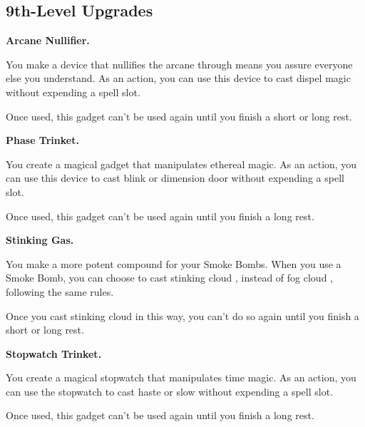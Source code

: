 \documentclass[11pt,twoside,openany]{book}  %
\begin{document}
\subsection{9th-Level Upgrades}
\begin{fiveitemize}

	\item \textbf{Arcane Nullifier.}
	
	You make a device that nullifies the arcane through means you assure everyone else you understand. As an action, you can use this device to cast dispel magic without expending a spell slot.

	Once used, this gadget can’t be used again until you finish a short or long rest.

	\item \textbf{Phase Trinket.}
	
	You create a magical gadget that manipulates ethereal magic. As an action, you can use this device to cast blink or dimension door without expending a spell slot.

	Once used, this gadget can’t be used again until you finish a long rest.

	\item \textbf{Stinking Gas.}
	
	You make a more potent compound for your Smoke Bombs. When you use a Smoke Bomb, you can choose to cast stinking cloud , instead of fog cloud , following the same rules.

	Once you cast stinking cloud in this way, you can’t do so again until you finish a short or long rest.

	\item \textbf{Stopwatch Trinket.}
	
	You create a magical stopwatch that manipulates time magic. As an action, you can use the stopwatch to cast haste or slow without expending a spell slot.

	Once used, this gadget can’t be used again until you finish a long rest.
\end{fiveitemize}
\end{document}
